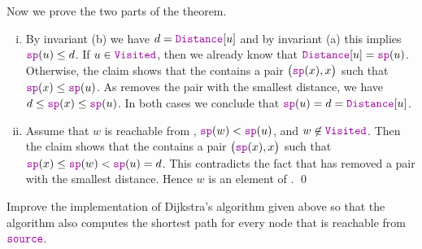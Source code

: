 \begin{enumerate}
  Now we prove the two parts of the theorem.
  \begin{enumerate}[(i)]
  \item By invariant (b) we have $d = \mytt{Distance}[u]$ and by invariant (a) this implies $\mytt{sp}(u) \leq d$.
        If $u \in \mytt{Visited}$, then we already know that $\mytt{Distance}[u] = \mytt{sp}(u)$.  Otherwise,
        the claim shows that the  contains a pair $\bigl(\mytt{sp}(x), x\bigr)$ such that
        $\mytt{sp}(x) \leq \mytt{sp}(u)$.  As  removes the pair with the smallest distance,
        we have $d \leq \mytt{sp}(x) \leq \mytt{sp}(u)$.  In both cases we conclude that 
        $\mytt{sp}(u) = d = \mytt{Distance}[u]$.
  \item Assume that $w$ is reachable from , $\mytt{sp}(w) < \mytt{sp}(u)$, and $w \not\in \mytt{Visited}$.
        Then the claim shows that the  contains a pair $\bigl(\mytt{sp}(x), x\bigr)$ such that
        $\mytt{sp}(x) \leq \mytt{sp}(w) < \mytt{sp}(u) = d$.  This contradicts the fact that 
        has removed a pair with the smallest distance.  Hence $w$ is an element of . \qed
  \end{enumerate}
\end{enumerate}


\exercise
Improve the implementation of Dijkstra's algorithm given above so that the algorithm also computes
the shortest path for every node that is reachable from $\mytt{source}$.
\eox


